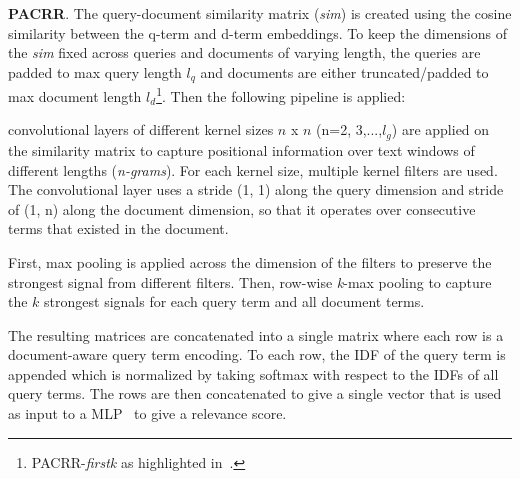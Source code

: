 \textbf{PACRR}. The query-document similarity matrix (\textit{sim}) is created using the cosine similarity between the q-term and d-term embeddings. To keep the dimensions of the \textit{sim} fixed across queries and documents of varying length, the queries are padded to max query length $l_q$ and documents are either truncated/padded to max document length $l_d$\footnote{PACRR-\textit{firstk} as highlighted in~\citep{pacrr17}.}. Then the following pipeline is applied: 
\begin{description}[font=\normalfont\itshape]
    \item[convolutional relevance matching.]  convolutional layers of different kernel sizes $n$ x $n$ (n=2, 3,...,$l_g$) are applied on the similarity matrix to capture positional information over text windows of different lengths (\textit{n-grams}). For each kernel size, multiple kernel filters are used. The convolutional layer uses a stride (1, 1) along the query dimension and stride of (1, n) along the document dimension, so that it operates over consecutive terms that existed in the document.
    \item[max pooling layers.] First, max pooling is applied across the dimension of the filters to preserve the strongest signal from different filters. Then, row-wise \textit{k}-max pooling to capture the $k$ strongest signals for each query term and all document terms.
    \item[MLP for global relevance.] The resulting matrices are concatenated into a single matrix where each row is a document-aware query term encoding. To each row, the IDF of the query term is appended which is normalized by taking softmax with respect to the IDFs of all query terms. The rows are then concatenated to give a single vector that is used as input to a MLP~\citep{co_pacrr_wsdm18} to give a relevance score.
\end{description}


